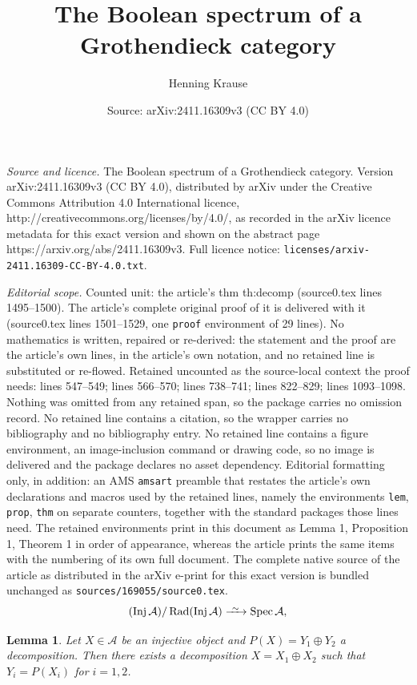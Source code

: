 \documentclass[10pt,a4paper]{amsart}
\title{The Boolean spectrum of a Grothendieck category}
\author{Henning Krause}
\date{Source: arXiv:2411.16309v3 (CC BY 4.0)}
\newtheorem{lem}{Lemma}
\def\A{\mathcal A}
\newcommand{\Inj}{\operatorname{Inj}}
\newcommand{\Rad}{\operatorname{Rad}}
\newcommand{\Spec}{\operatorname{Spec}}
\newcommand{\longiso}{\xrightarrow{\ \raisebox{-.4ex}[0ex][0ex]{$\scriptstyle{\sim}$}\ }}
\begin{document}
\maketitle

\noindent\emph{Source and licence.} The Boolean spectrum of a Grothendieck category. Version arXiv:2411.16309v3 (CC BY 4.0), distributed by arXiv under the Creative Commons Attribution 4.0 International licence, http://creativecommons.org/licenses/by/4.0/, as recorded in the arXiv licence metadata for this exact version and shown on the abstract page https://arxiv.org/abs/2411.16309v3. Full licence notice: \texttt{licenses/arxiv-2411.16309-CC-BY-4.0.txt}.\par\smallskip

\noindent\textit{Editorial scope.} Counted unit: the article's thm th:decomp (source0.tex lines 1495--1500). The article's complete original proof of it is delivered with it (source0.tex lines 1501--1529, one \texttt{proof} environment of 29 lines). No mathematics is written, repaired or re-derived: the statement and the proof are the article's own lines, in the article's own notation, and no retained line is substituted or re-flowed.  Retained uncounted as the source-local context the proof needs: lines 547--549; lines 566--570; lines 738--741; lines 822--829; lines 1093--1098.  Nothing was omitted from any retained span, so the package carries no omission record.  No retained line contains a citation, so the wrapper carries no bibliography and no bibliography entry.  No retained line contains a figure environment, an image-inclusion command or drawing code, so no image is delivered and the package declares no asset dependency.  Editorial formatting only, in addition: an AMS \texttt{amsart} preamble that restates the article's own declarations and macros used by the retained lines, namely the environments \texttt{lem}, \texttt{prop}, \texttt{thm} on separate counters, together with the standard packages those lines need.  The retained environments print in this document as Lemma 1, Proposition 1, Theorem 1 in order of appearance, whereas the article prints the same items with the numbering of its own full document.  The complete native source of the article as distributed in the arXiv e-print for this exact version is bundled unchanged as \texttt{sources/169055/source0.tex}.
\begin{equation}\label{eq:Spec}
  (\Inj\A)/\Rad(\Inj\A)\longiso\Spec\A,
\end{equation}

\begin{lem}\label{le:spec-decomp-inj}
  Let $X\in\A$ be an injective object and $P(X)=Y_1\oplus Y_2$ a
  decomposition. Then there exists a decomposition $X=X_1\oplus X_2$
  such that $Y_i=P(X_i)$ for $i=1,2$.
\end{lem}
\end{document}
